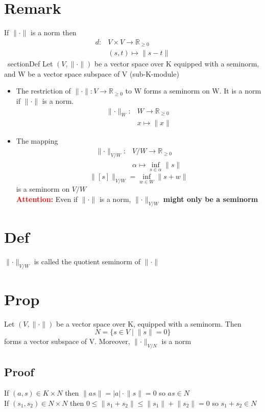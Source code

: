 \documentclass{book}
\begin{document}
\section{Remark}
If $\lVert\cdot\rVert$ is a norm then $$\begin{aligned}
    d:&V\times V\rightarrow \mathbb{R}_{\geq 0}\\
    &(s,t)\mapsto\lVert s-t\rVert
\end{aligned}$$\
section{Def}
Let $(V,\lVert\cdot\rVert)$ be a vector space over K equipped with a seminorm, and W be a vector space subspace of V (sub-K-module)
\begin{itemize}
    \item The restriction of $\lVert\cdot\rVert: V\rightarrow\mathbb{R}_{\geq0}$ to W forms a seminorm on W. It is a norm if $\lVert\cdot\rVert$ is a norm.
    $$\begin{aligned}
        \lVert\cdot\rVert _W: &W\rightarrow\mathbb{R}_{\geq0}\\ &x\mapsto\lVert x\rVert
    \end{aligned}$$
    \item The mapping $$\begin{aligned}
        \lVert\cdot\rVert _{V/W}:& V/W\rightarrow\mathbb{R}_{\geq 0}\\&\alpha\mapsto\inf\limits_{s\in \alpha}\lVert s\rVert
    \end{aligned}$$$$\lVert[s]\rVert _{V/W}=\inf\limits_{w\in W}\lVert s+w\rVert$$ is a seminorm on $V/W$\\
        \textcolor{red}{\textbf{Attention:} }
        Even if $\lVert \cdot\rVert$ is a norm, $\lVert\cdot\rVert _{V/W}$ \textbf{might only be a seminorm}

\end{itemize}
\section{Def}
$\lVert\cdot\rVert _{V/W}$ is called the quotient seminorm of $\lVert\cdot\rVert$
\section{Prop}
Let $(V,\lVert\cdot\rVert)$ be a vector space over K, equipped with a seminorm. Then $$N=\{s\in V\mid\lVert s\rVert=0\}$$
forms a vector subspace of V. Moreover, $\lVert\cdot\rVert _{V/N}$ is a norm
\subsection*{Proof}
If $(a,s)\in K\times N$ then $\lVert as\rVert=\lvert a\rvert\cdot\lVert s\rVert=0$ so $as\in N$\\
If $(s_1,s_2)\in N\times N$ then $0\leq\lVert s_1+s_2\rVert\leq \lVert s_1\rVert+\lVert s_2\rVert=0$ so $s_1+s_2\in N$
\end{document}
